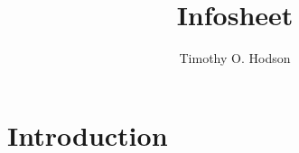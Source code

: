 \documentclass{article} %
\title{Infosheet} %
\author{Timothy O. Hodson} %
\begin{document}
\maketitle %
\thispagestyle{fancy}

\begin{abstract}
    \blindtext
\end{abstract}

\section{Introduction} %
\blindtext
\end{document}
